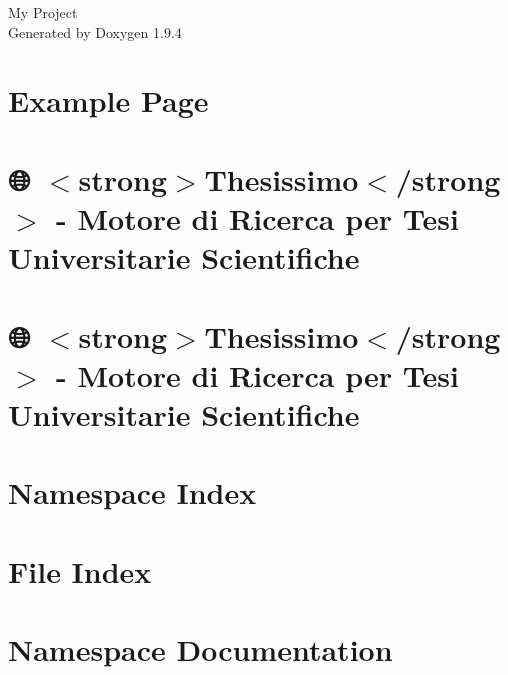 \documentclass[twoside]{book}
\newcommand{\+}{\discretionary{\mbox{\scriptsize$\hookleftarrow$}}{}{}}
\newcommand{\clearemptydoublepage}{%
    \newpage{\pagestyle{empty}\cleardoublepage}%
  }
\begin{document}
  \raggedbottom
    \hypersetup{pageanchor=false,
                bookmarksnumbered=true,
                pdfencoding=unicode
               }
  \begin{titlepage}
  \vspace*{7cm}
  \begin{center}%
  {\Large My Project}\\
  \vspace*{1cm}
  {\large Generated by Doxygen 1.9.4}\\
  \end{center}
  \end{titlepage}
  \clearemptydoublepage
  \tableofcontents
  \clearemptydoublepage
  \hypersetup{pageanchor=true}
\chapter{Example Page}
\label{page1}

\chapter{🌐 \texorpdfstring{$<$}{<}strong\texorpdfstring{$>$}{>}Thesissimo\texorpdfstring{$<$}{<}/strong\texorpdfstring{$>$}{>} -\/ Motore di Ricerca per Tesi Universitarie Scientifiche}
\label{md_README}

\chapter{🌐 \texorpdfstring{$<$}{<}strong\texorpdfstring{$>$}{>}Thesissimo\texorpdfstring{$<$}{<}/strong\texorpdfstring{$>$}{>} -\/ Motore di Ricerca per Tesi Universitarie Scientifiche}
\label{md__root_JuriScan_README}

\chapter{Namespace Index}

\chapter{File Index}

\chapter{Namespace Documentation}





















\end{document}
